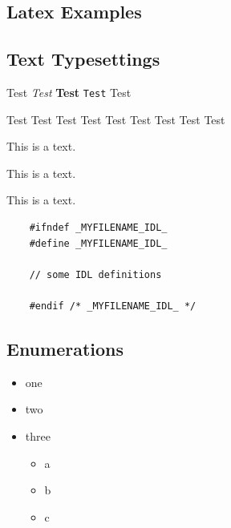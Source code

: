 \begin{appendix}

\chapter{Latex Examples}

\section{Text Typesettings}

Test {\it Test} {\bf Test} {\tt Test} {\sc Test}

\tiny{Test} \small{Test} \normalsize{Test} \large{Test} \Large{Test}
\LARGE{Test} \huge{Test} \Huge{Test}
\normalsize{Test}

\begin{center}
This is a text. 
\end{center}

\begin{flushleft}
This is a text.
\end{flushleft}

\begin{flushright}
This 
is 
a 
text.

\end{flushright}

\begin{verbatim}
    #ifndef _MYFILENAME_IDL_
    #define _MYFILENAME_IDL_
    
    // some IDL definitions

    #endif /* _MYFILENAME_IDL_ */
\end{verbatim}

\newpage

\section{Enumerations}

\begin{itemize}
  \item one
  \item two
  \item three
  \begin{itemize}
    \item a
    \item b
    \item c
  \end{itemize}
\end{itemize}


\end{appendix}
